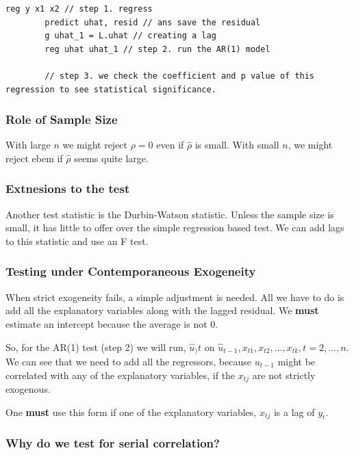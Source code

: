 \documentclass[11pt]{article}
\begin{document}
    \begin{lstlisting}[caption = Example of Code to do these steps]
        reg y x1 x2 // step 1. regress
        predict uhat, resid // ans save the residual
        g uhat_1 = L.uhat // creating a lag
        reg uhat uhat_1 // step 2. run the AR(1) model

        // step 3. we check the coefficient and p value of this regression to see statistical significance.
    \end{lstlisting}

\subsubsection{Role of Sample Size}

With large $n$ we might reject $\rho = 0$ even if $\hat{\rho}$ is small. With small $n$, we might reject ebem if $\hat{\rho}$ seems quite large.

\subsubsection{Extnesions to the test}

Another test statistic is the Durbin-Watson statistic. Unless the sample size is small, it has little to offer over the simple regression based test. We can add lags to this statistic and use an F test.

\subsubsection{Testing under Contemporaneous Exogeneity}

When strict exogeneity fails, a simple adjustment is needed. All we have to do is add all the explanatory variables along with the lagged residual. We \textbf{must} estimate an intercept because the average is not 0.

So, for the AR(1) test (step 2) we will run, $\hat{u}_)t$ on $\hat{u}_{t-1}, x_{t1}, x_{t2}, \ldots, x_{tk}, t=2,\ldots, n$. We can see that we need to add all the regressors, because $u_{t-1}$ might be correlated with any of the explanatory variables, if the $x_{tj}$ are not strictly exogenous.

One \textbf{must} use this form if one of the explanatory variables, $x_{tj}$ is a lag of $y_t$.

\subsubsection{Why do we test for serial correlation?}
\end{document}
